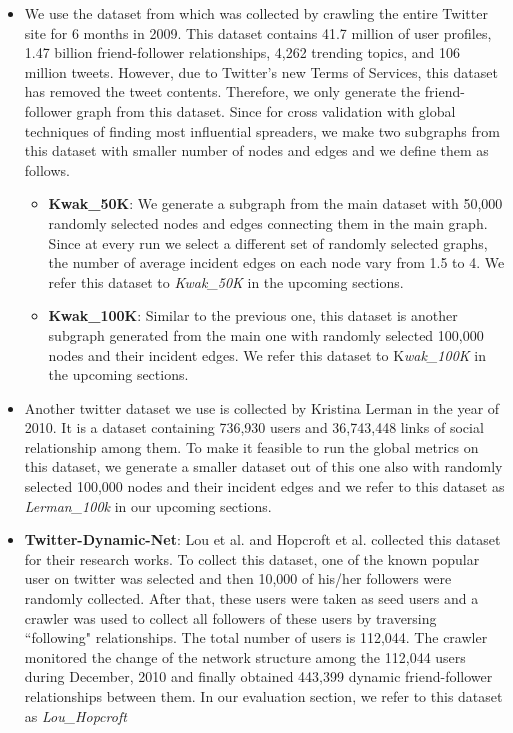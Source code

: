 \documentclass[sigconf]{acmart}
\begin{document}
\begin{itemize}
	\item We use the dataset from \cite{Kwak10www} which was collected by crawling the entire Twitter site for 6 months in 2009. This dataset contains 41.7 million of user profiles, 1.47 billion friend-follower relationships, 4,262 trending topics, and 106 million tweets. However, due to Twitter's new Terms of Services, this dataset has removed the tweet contents. Therefore, we only generate the friend-follower graph from this dataset. Since for cross validation with global techniques of finding most influential spreaders, we make two subgraphs from this dataset with smaller number of nodes and edges and we define them as follows.
	\begin{itemize}
		\item \textbf{Kwak\_50K}: We generate a subgraph from the main dataset with 50,000 randomly selected nodes and edges connecting them in the main graph. Since at every run we select a different set of randomly selected graphs, the number of average incident edges on each node vary from 1.5 to 4. We refer this dataset to \textit{Kwak\_50K} in the upcoming sections.
		\item \textbf{Kwak\_100K}: Similar to the previous one, this dataset is another subgraph generated from the main one with randomly selected 100,000 nodes and their incident edges. We refer this dataset to K\textit{wak\_100K} in the upcoming sections.
	\end{itemize}

	\item Another twitter dataset we use is collected by Kristina Lerman \cite{Lerman2010} in the year of 2010. It is a dataset containing 736,930 users and 36,743,448 links of social relationship among them. To make it feasible to run the global metrics on this dataset, we  generate a smaller dataset out of this one also with randomly selected 100,000 nodes and their incident edges and we refer to this dataset as \textit{Lerman\_100k} in our upcoming sections.
	
	\item \textbf{Twitter-Dynamic-Net}: Lou et al. \cite{lou2013learning} and Hopcroft et al. \cite{hopcroft2011will} collected this dataset for their research works. To collect this dataset, one of the known popular user on twitter was selected and then 10,000 of his/her followers were randomly collected. After that, these users were taken as seed users and a crawler was used to collect all followers of these users by traversing ``following" relationships. The total number of users is 112,044. The crawler monitored the change of the network structure among the 112,044 users during December, 2010 and finally obtained 443,399 dynamic friend-follower relationships between them. In our evaluation section, we refer to this dataset as \textit{Lou\_Hopcroft}
	
\end{itemize}
\end{document}

